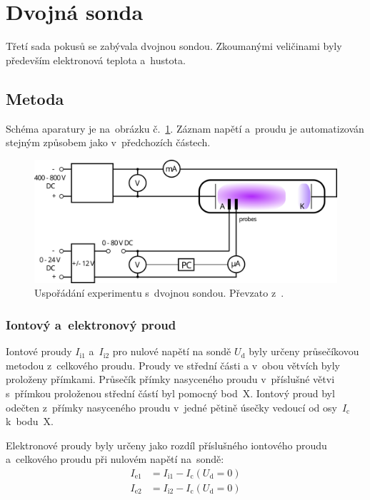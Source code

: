 \documentclass{protokol}
\newcommand\iion{I_\mathrm{i}}
\newcommand\iioni{I_{\mathrm{i}1}}
\newcommand\iionii{I_{\mathrm{i}2}}
\newcommand\ieleci{I_{\mathrm{e}1}}
\newcommand\ielecii{I_{\mathrm{e}2}}
\newcommand\idouble{I_{\mathrm{c}}}
\newcommand\udouble{U_\mathrm{d}}
\begin{document}
\clearpage
\section{Dvojná sonda}
\label{sec:double}
Třetí sada pokusů se zabývala dvojnou sondou.
Zkoumanými veličinami byly především elektronová teplota a~hustota.

\subsection{Metoda}
\label{sec:method-double}
Schéma aparatury je na~obrázku č.~\ref{fig:diagram-double}.
Záznam napětí a~proudu je automatizován stejným způsobem jako
v~předchozích částech.

\begin{figure}[hbp]
	\centering
	\includegraphics{diagram-double.png}
	\caption{Uspořádání experimentu s~dvojnou sondou.
		Převzato z~\autocite{assignment-doubleprobe}.}
	\label{fig:diagram-double}
\end{figure}

\subsubsection{Iontový a~elektronový proud}
Iontové proudy $\iioni$ a~$\iionii$ pro nulové napětí na sondě $\udouble$
byly určeny průsečíkovou metodou z~celkového proudu.
Proudy ve střední části a v~obou větvích byly proloženy přímkami.
Průsečík přímky nasyceného proudu v~příslušné větvi s~přímkou proloženou
střední částí byl pomocný bod~X.
Iontový proud byl odečten z~přímky nasyceného proudu v~jedné pětině
úsečky vedoucí od osy~$\idouble$ k~bodu~X.

Elektronové proudy byly určeny jako rozdíl příslušného iontového proudu
a~celkového proudu při nulovém napětí na~sondě:
\begin{align}
	\label{eq:ieleci}
	\ieleci  &= \iioni  - \idouble(\udouble = 0) \\
	\ielecii &= \iionii - \idouble(\udouble = 0)
\end{align}
\end{document}
